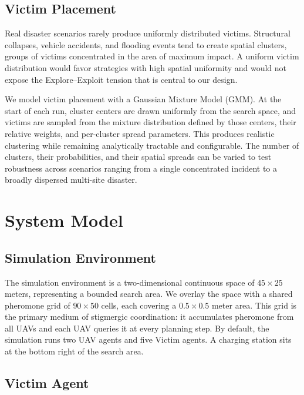 \documentclass[10pt,a4paper,twocolumn]{article}
\begin{document}
\subsection{Victim Placement}
\label{sec:design_victim}

Real disaster scenarios rarely produce uniformly distributed victims. Structural collapses, vehicle accidents, and flooding events tend to create spatial clusters, groups of victims concentrated in the area of maximum impact. A uniform victim distribution would favor strategies with high spatial uniformity and would not expose the Explore--Exploit tension that is central to our design.

We model victim placement with a Gaussian Mixture Model (GMM). At the start of each run, cluster centers are drawn uniformly from the search space, and victims are sampled from the mixture distribution defined by those centers, their relative weights, and per-cluster spread parameters. This produces realistic clustering while remaining analytically tractable and configurable. The number of clusters, their probabilities, and their spatial spreads can be varied to test robustness across scenarios ranging from a single concentrated incident to a broadly dispersed multi-site disaster.

\section{System Model}

\subsection{Simulation Environment}

The simulation environment is a two-dimensional continuous space of $45 \times 25$ meters, representing a bounded search area. We overlay the space with a shared pheromone grid of $90 \times 50$ cells, each covering a $0.5 \times 0.5$ meter area. This grid is the primary medium of stigmergic coordination: it accumulates pheromone from all UAVs and each UAV queries it at every planning step. By default, the simulation runs two UAV agents and five Victim agents. A charging station sits at the bottom right of the search area.

\subsection{Victim Agent}
\end{document}
